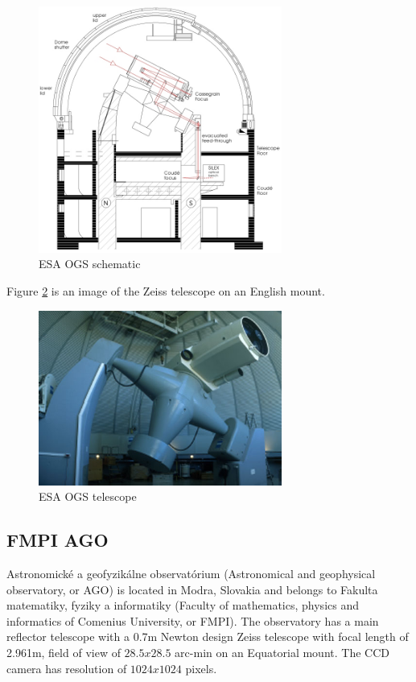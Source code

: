 \begin{figure}[H]
\centering
  \includegraphics[width=8cm]{images/ESAOGS1}
  \caption{ESA OGS schematic}
  \label{fig:esaogs1}
\end{figure}

	Figure \ref{fig:esaogs2} is an image of the Zeiss telescope on an English mount.

\begin{figure}[H]
\centering
  \includegraphics[width=8cm]{images/ESAOGS2}
  \caption{ESA OGS telescope}
  \label{fig:esaogs2}
\end{figure}

\subsection{FMPI AGO}\label{subsec:fmpi_ago}
Astronomické a geofyzikálne observatórium (Astronomical and geophysical observatory, or AGO) is located in Modra, Slovakia and belongs to Fakulta matematiky, fyziky a informatiky (Faculty of mathematics, physics and informatics of Comenius University, or FMPI). The observatory has a main reflector telescope with a 0.7m Newton design Zeiss telescope with focal length of 2.961m, field of view of $28.5 x 28.5$ arc-min on an Equatorial mount. The CCD camera has resolution of $1024 x 1024$ pixels.

